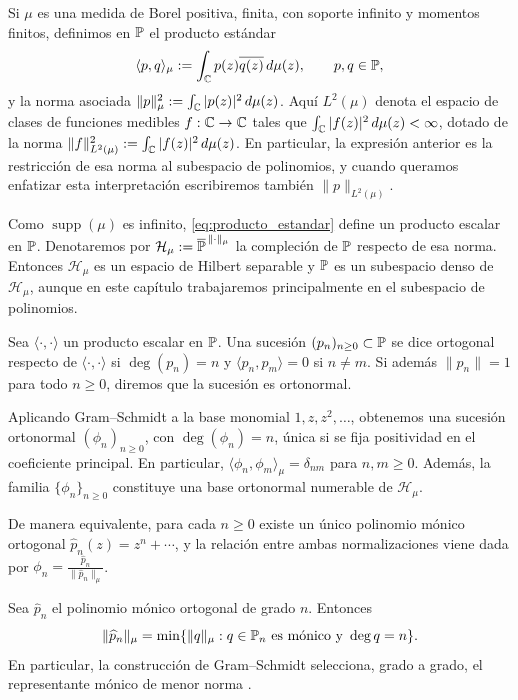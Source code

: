 Si \(\mu\) es una medida de Borel positiva, finita, con soporte infinito y momentos finitos,
definimos en \(\mathbb{P}\) el producto estándar
\begin{equation}\label{eq:producto_estandar}
	\langle p,q\rangle_\mu
	:=
	\int_{\mathbb{C}} p(z)\overline{q(z)}\,d\mu(z),
	\qquad p,q\in\mathbb{P},
\end{equation}
y la norma asociada
\(\|p\|_\mu^2:=\int_{\mathbb{C}}|p(z)|^2\,d\mu(z)\).
Aquí \(L^2(\mu)\) denota el espacio de clases de funciones medibles
\(f:\mathbb{C}\to\mathbb{C}\) tales que \(\int_{\mathbb{C}}|f(z)|^2\,d\mu(z)<\infty\),
dotado de la norma \(\|f\|_{L^2(\mu)}^2:=\int_{\mathbb{C}}|f(z)|^2\,d\mu(z)\).
En particular, la expresión anterior es la restricción de esa norma al subespacio
de polinomios, y cuando queramos enfatizar esta interpretación escribiremos
también \(\|p\|_{L^2(\mu)}\).

Como \(\operatorname{supp}(\mu)\) es infinito, \eqref{eq:producto_estandar}
define un producto escalar en \(\mathbb{P}\). Denotaremos por
\(\mathcal H_\mu:=\overline{\mathbb{P}}^{\,\|\cdot\|_\mu}\)
la compleción de \(\mathbb{P}\) respecto de esa norma. Entonces \(\mathcal H_\mu\)
es un espacio de Hilbert separable y \(\mathbb{P}\) es un subespacio denso de
\(\mathcal H_\mu\), aunque en este capítulo trabajaremos principalmente en el
subespacio de polinomios.

\begin{defn}\label{def:polinomios_ortogonales}
	Sea \(\langle\cdot,\cdot\rangle\) un producto escalar en \(\mathbb{P}\). Una
	sucesión \((p_n)_{n\ge 0}\subset\mathbb{P}\) se dice ortogonal respecto de
	\(\langle\cdot,\cdot\rangle\) si \(\deg(p_n)=n\) y
	\(\langle p_n,p_m\rangle=0\) si \(n\neq m\).
	Si además \(\|p_n\|=1\) para todo \(n\ge 0\), diremos que la sucesión es
	ortonormal.
\end{defn}

Aplicando Gram--Schmidt a la base monomial \(1,z,z^2,\dots\), obtenemos una
sucesión ortonormal \((\phi_n)_{n\ge 0}\), con \(\deg(\phi_n)=n\),
única si se fija positividad en el coeficiente principal. En particular,
\(\langle \phi_n,\phi_m\rangle_\mu=\delta_{nm}\) para \(n,m\ge 0\).
Además, la familia \(\{\phi_n\}_{n\ge 0}\) constituye una base ortonormal
numerable de \(\mathcal H_\mu\).

De manera equivalente, para cada \(n\ge 0\) existe un único polinomio mónico
ortogonal \(\widehat p_n(z)=z^n+\cdots\), y la relación entre ambas
normalizaciones viene dada por
\(\phi_n=\frac{\widehat p_n}{\|\widehat p_n\|_\mu}\).

\begin{prop}
	\label{prop:minima_norma_intro}
	Sea \(\widehat p_n\) el polinomio mónico ortogonal de grado \(n\). Entonces
	\[
		\|\widehat p_n\|_\mu
		=
		\min\{\|q\|_\mu : q\in\mathbb{P}_n \text{ es mónico y } \deg q=n\}.
	\]
	En particular, la construcción de Gram--Schmidt selecciona, grado a grado, el
	representante mónico de menor norma \cite{Chi78,szego1975orthogonal}.
\end{prop}

